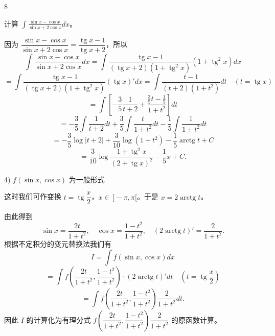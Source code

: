 \begin{sourceexample}{8}

	计算 \(\displaystyle\int\frac{\sin x-\cos x}{\sin x+2\cos x}dx\)。

	因为 \(\dfrac{\sin x-\cos x}{\sin x+2\cos x}=\dfrac{\operatorname{tg}x-1}{\operatorname{tg}x+2}\)，所以
	\[
	\int\frac{\sin x-\cos x}{\sin x+2\cos x}dx=\int\frac{\operatorname{tg}x-1}{(\operatorname{tg}x+2)(1+\operatorname{tg}^2x)}(1+\operatorname{tg}^2x)dx
	\]
	\[
	=\int\frac{\operatorname{tg}x-1}{(\operatorname{tg}x+2)(1+\operatorname{tg}^2x)}(\operatorname{tg}x)'dx=\int\frac{t-1}{(t+2)(1+t^2)}dt\quad(t=\operatorname{tg}x)
	\]
	\[
	=\int\left[-\frac35\frac1{t+2}+\frac{\frac35t-\frac15}{1+t^2}\right]dt
	\]
	\[
	=-\frac35\int\frac1{t+2}dt+\frac35\int\frac{t}{1+t^2}dt-\frac15\int\frac1{1+t^2}dt
	\]
	\[
	=-\frac35\log|t+2|+\frac3{10}\log(1+t^2)-\frac15\operatorname{arctg}t+C
	\]
	\[
	=\frac3{10}\log\frac{1+\operatorname{tg}^2x}{(2+\operatorname{tg}x)^2}-\frac15x+C.
	\]

\end{sourceexample}

4) \(f(\sin x,\cos x)\) 为一般形式

这时我们可作变换 \(t=\operatorname{tg}\dfrac x2\)，\(x\in\ ]-\pi,\pi[\)。于是 \(x=2\operatorname{arctg}t\)。

由此得到
\[
\sin x=\frac{2t}{1+t^2},\quad\cos x=\frac{1-t^2}{1+t^2},\quad(2\operatorname{arctg}t)'=\frac2{1+t^2}.
\]
根据不定积分的变元替换法我们有
\[
I=\int f(\sin x,\cos x)dx
\]
\[
=\int f\left(\frac{2t}{1+t^2},\frac{1-t^2}{1+t^2}\right)\cdot(2\operatorname{arctg}t)'dt\quad\left(t=\operatorname{tg}\frac x2\right)
\]
\[
=\int f\left(\frac{2t}{1+t^2},\frac{1-t^2}{1+t^2}\right)\frac2{1+t^2}dt.
\]
因此 \(I\) 的计算化为有理分式 \(f\left(\dfrac{2t}{1+t^2},\dfrac{1-t^2}{1+t^2}\right)\dfrac2{1+t^2}\) 的原函数计算。

